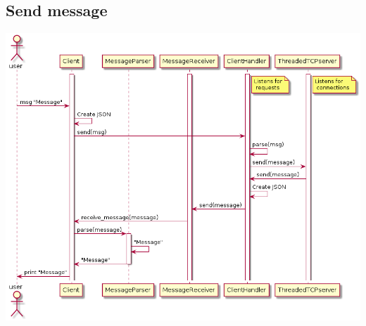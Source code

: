 \documentclass[11pt]{article}
\begin{document}
\subsection{Send message}
\label{sec-2-2}
\includegraphics[width=.9\linewidth]{sequence_msg.png}
\end{document}
